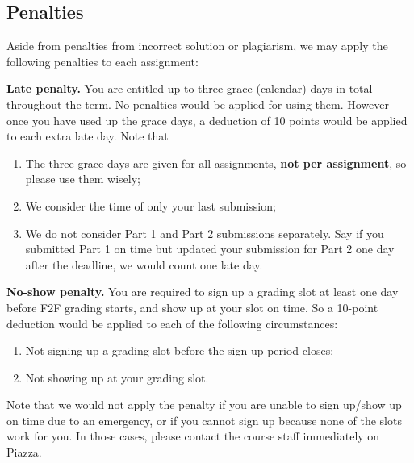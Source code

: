 \documentclass[12pt]{exam}
\begin{document}
\subsection{Penalties}
Aside from penalties from incorrect solution or plagiarism, we may apply the following
penalties to each assignment:

\textbf{Late penalty.} You are entitled up to three grace (calendar) days in total
throughout the term. No penalties would be applied for using them. However once
you have used up the grace days, a deduction of 10 points would be applied to each
extra late day. Note that
\begin{enumerate}
  \item The three grace days are given for all assignments, \textbf{not per assignment}, so please use them wisely;
  \item We consider the time of only your last submission;
  \item We do not consider Part 1 and Part 2 submissions separately. Say if you submitted Part 1 on time but updated your submission for Part 2 one day after the deadline, we would count one late day.
\end{enumerate}

\textbf{No-show penalty.} You are required to sign up a grading slot at least one day
before F2F grading starts, and show up at your slot on time. So a 10-point deduction would
be applied to each of the following circumstances:
\begin{enumerate}
  \item Not signing up a grading slot before the sign-up period closes;
  \item Not showing up at your grading slot.
\end{enumerate}
Note that we would not apply the penalty if you are unable to sign up/show up on time
due to an emergency, or if you cannot sign up because none of the slots work for you.
In those cases, please contact the course staff immediately on Piazza.
\end{document}
